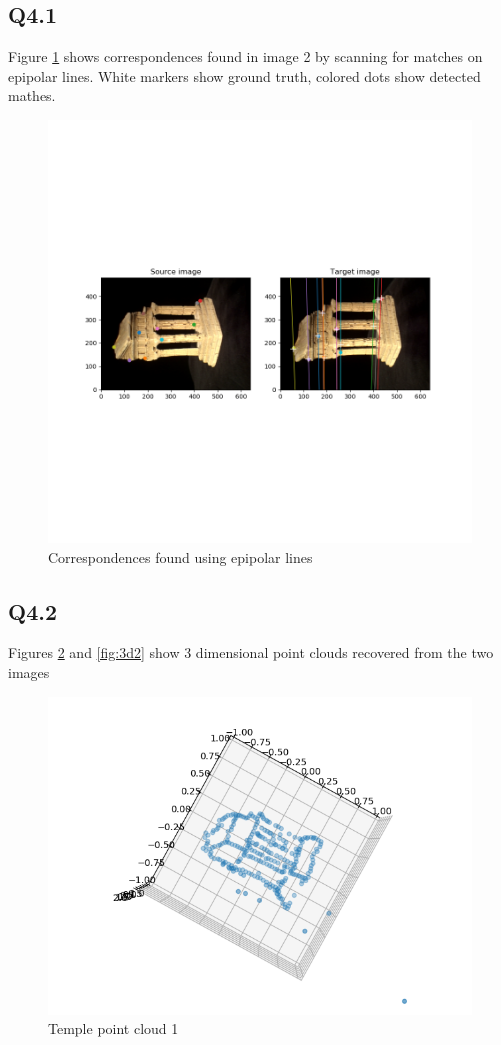 \documentclass[12pt]{article}
\begin{document}
\subsection{Q4.1}
Figure \ref{fig:corr41} shows correspondences found in image 2 by scanning for matches on epipolar lines. White markers show ground truth, colored dots show detected mathes.
\begin{figure}[H]
\centering
\includegraphics[page=1,width=1\textwidth]{q4_1}
\caption{Correspondences found using epipolar lines } 
\label{fig:corr41}
\end{figure}   

\newpage
\subsection{Q4.2}
Figures \ref{fig:3d1} and \ref{fig:3d2} show 3 dimensional point clouds recovered from the two images
\begin{figure}[H]
\centering
\includegraphics[page=1,width=1\textwidth]{q4_2a}
\caption{Temple point cloud 1 } 
\label{fig:3d1}
\end{figure}   
\end{document}
